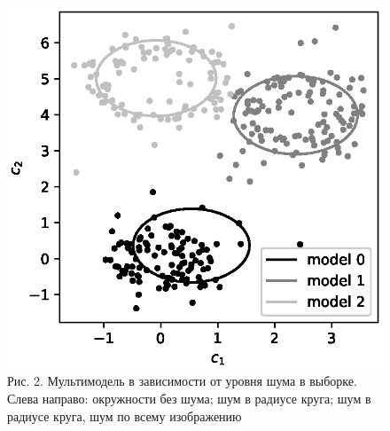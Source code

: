 \documentclass[12pt]{a&t}
\begin{document}
\begin{figure}[h!]
	\includegraphics[height = 0.2\textheight]{902.eps}

\caption{Рис. 2. Мультимодель в зависимости от уровня шума в выборке. Слева направо: окружности без шума; шум в радиусе круга; шум в радиусе круга, шум по всему изображению}
\label{ce:fig3}
\end{figure}
\end{document}
